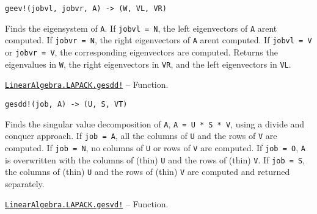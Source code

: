 \begin{adjustwidth}{2em}{0pt}


\begin{verbatim}
geev!(jobvl, jobvr, A) -> (W, VL, VR)
\end{verbatim}

Finds the eigensystem of \texttt{A}. If \texttt{jobvl = N}, the left eigenvectors of \texttt{A} aren{\textquotesingle}t computed. If \texttt{jobvr = N}, the right eigenvectors of \texttt{A} aren{\textquotesingle}t computed. If \texttt{jobvl = V} or \texttt{jobvr = V}, the corresponding eigenvectors are computed. Returns the eigenvalues in \texttt{W}, the right eigenvectors in \texttt{VR}, and the left eigenvectors in \texttt{VL}.



\end{adjustwidth}
\hypertarget{15765350085042341790}{}
\hyperlink{15765350085042341790}{\texttt{LinearAlgebra.LAPACK.gesdd!}}  -- {Function.}

\begin{adjustwidth}{2em}{0pt}


\begin{verbatim}
gesdd!(job, A) -> (U, S, VT)
\end{verbatim}

Finds the singular value decomposition of \texttt{A}, \texttt{A = U * S * V{\textquotesingle}}, using a divide and conquer approach. If \texttt{job = A}, all the columns of \texttt{U} and the rows of \texttt{V{\textquotesingle}} are computed. If \texttt{job = N}, no columns of \texttt{U} or rows of \texttt{V{\textquotesingle}} are computed. If \texttt{job = O}, \texttt{A} is overwritten with the columns of (thin) \texttt{U} and the rows of (thin) \texttt{V{\textquotesingle}}. If \texttt{job = S}, the columns of (thin) \texttt{U} and the rows of (thin) \texttt{V{\textquotesingle}} are computed and returned separately.



\end{adjustwidth}
\hypertarget{12815780161722855374}{}
\hyperlink{12815780161722855374}{\texttt{LinearAlgebra.LAPACK.gesvd!}}  -- {Function.}

